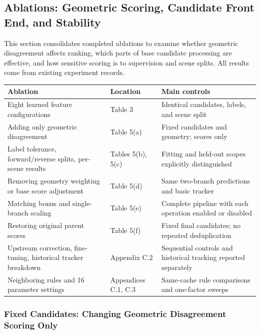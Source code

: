 \subsection{Ablations: Geometric Scoring, Candidate Front End, and Stability}

This section consolidates completed ablations to examine whether geometric disagreement affects ranking, which parts of base candidate processing are effective, and how sensitive scoring is to supervision and scene splits. All results come from existing experiment records.

\begin{table}[t]
\centering
\small
\setlength{\tabcolsep}{3pt}
\renewcommand{\arraystretch}{1.12}
\setlength{\tableusable}{\dimexpr\linewidth-6\tabcolsep\relax}
\begin{tabular}{>{\raggedright\arraybackslash}p{0.5600\tableusable}>{\raggedright\arraybackslash}p{0.2200\tableusable}>{\raggedright\arraybackslash}p{0.2200\tableusable}}
\toprule
Ablation & Location & Main controls \\
\midrule
Eight learned feature configurations & Table 3 & Identical candidates, labels, and scene split \\
Adding only geometric disagreement & Table 5(a) & Fixed candidates and geometry; scores only \\
Label tolerance, forward/reverse splits, per-scene results & Tables 5(b), 5(c) & Fitting and held-out scopes explicitly distinguished \\
Removing geometry weighting or base score adjustment & Table 5(d) & Same two-branch predictions and basic tracker \\
Matching bonus and single-branch scaling & Table 5(e) & Complete pipeline with each operation enabled or disabled \\
Restoring original parent scores & Table 5(f) & Fixed final candidates; no repeated deduplication \\
Upstream correction, fine-tuning, historical tracker breakdown & Appendix C.2 & Sequential controls and historical tracking reported separately \\
Neighboring rules and 16 parameter settings & Appendices C.1, C.3 & Same-cache rule comparisons and one-factor sweeps \\
\bottomrule
\end{tabular}
\end{table}

\subsubsection{Fixed Candidates: Changing Geometric Disagreement Scoring Only}

